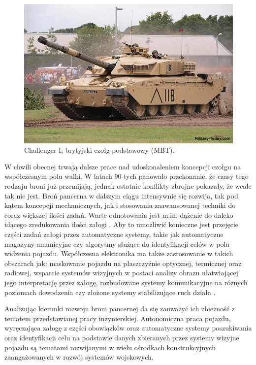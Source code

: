  \begin{figure}[H]
    \begin{center}
      \includegraphics[scale=0.5]{imgs/chal1.jpg}
 \caption[Czołg \textit{Challenger I}]{\small{Challenger I, brytyjski czołg podstawowy (MBT).}\footnotemark[8]}
        \label{challenger}
    \end{center}
  \end{figure}

W chwili obecnej trwają dalsze prace nad udoskonaleniem koncepcji czołgu na współczesnym polu walki. W latach 90-tych panowało przekonanie, że czasy tego rodzaju broni już przemijają, jednak ostatnie konflikty zbrojne pokazały, że wcale tak nie jest. Broń pancerna w dalszym ciągu intensywnie się rozwija, tak pod kątem koncepcji mechanicznych, jak i stosowania zaawansowanej techniki do coraz większej ilości zadań. Warte odnotowania jest m.in. dążenie do daleko idącego zredukowania ilości załogi \cite{programy_rozwoju}. Aby to umożliwić konieczne jest przejęcie części zadań załogi przez automatyczne systemy, takie jak automatyczne magazyny amunicyjne czy algorytmy służące do identyfikacji celów w polu widzenia pojazdu. Współczesna elektronika ma także zastosowanie w takich obszarach jak: maskowanie pojazdu na płaszczyźnie optycznej, termicznej oraz radiowej, wsparcie systemów wizyjnych w postaci analizy obrazu ułatwiającej jego interpretację przez załogę, rozbudowane systemy komunikacyjne na różnych poziomach dowodzenia czy złożone systemy stabilizujące ruch działa \cite{czolg_przyszlosci}.

Analizując kierunki rozwoju broni pancernej da się zauważyć ich zbieżność z tematem przedstawianej pracy inżynierskiej. Autonomiczna praca pojazdu, wyręczająca załogę z części obowiązków oraz automatyczne systemy poszukiwania oraz identyfikacji celu na podstawie danych zbieranych przez systemy wizyjne pojazdu są tematami rozwijanymi w wielu ośrodkach konstrukcyjnych zaangażowanych w rozwój systemów wojskowych.

